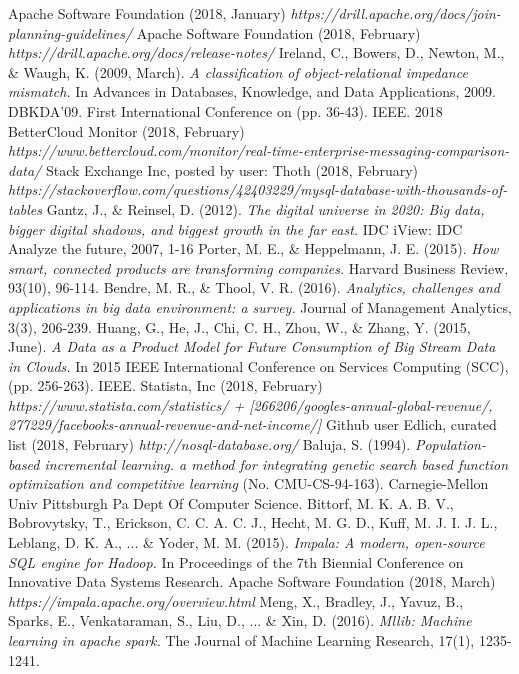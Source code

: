 \documentclass[a4paper,english]{report}
\begin{document}
\begin{thebibliography}{1}
		Apache Software Foundation (2018, January)
		\emph{https://drill.apache.org/docs/join-planning-guidelines/}
		Apache Software Foundation (2018, February) 	\emph{https://drill.apache.org/docs/release-notes/}
		Ireland, C., Bowers, D., Newton, M., \& Waugh, K. (2009, March). \emph{A classification of object-relational impedance mismatch.} In Advances in Databases, Knowledge, and Data Applications, 2009. DBKDA'09. First International Conference on (pp. 36-43). IEEE.
		2018 BetterCloud Monitor (2018, February)
		\emph{https://www.bettercloud.com/monitor/real-time-enterprise-messaging-comparison-data/}
		Stack Exchange Inc, posted by user: Thoth (2018, February) \emph{https://stackoverflow.com/questions/42403229/mysql-database-with-thousands-of-tables}
		Gantz, J., \& Reinsel, D. (2012). \emph{The digital universe in 2020: Big data, bigger digital shadows, and biggest growth in the far east.} IDC iView: IDC Analyze the future, 2007, 1-16
		Porter, M. E., \& Heppelmann, J. E. (2015). \emph{How smart, connected products are transforming companies.} Harvard Business Review, 93(10), 96-114.
		Bendre, M. R., \& Thool, V. R. (2016). \emph{Analytics, challenges and applications in big data environment: a survey.} Journal of Management Analytics, 3(3), 206-239.
		Huang, G., He, J., Chi, C. H., Zhou, W., \& Zhang, Y. (2015, June). \emph{A Data as a Product Model for Future Consumption of Big Stream Data in	Clouds.} In 2015 IEEE International Conference on Services Computing (SCC), (pp. 256-263). IEEE.
		Statista, Inc (2018, February) \emph{https://www.statista.com/statistics/ + [266206/googles-annual-global-revenue/, 277229/facebooks-annual-revenue-and-net-income/]}
		Github user Edlich, curated list (2018, February) \emph{http://nosql-database.org/}
		Baluja, S. (1994). \emph{Population-based incremental learning. a method for integrating genetic search based function optimization and competitive learning} (No. CMU-CS-94-163). Carnegie-Mellon Univ Pittsburgh Pa Dept Of Computer Science.
		Bittorf, M. K. A. B. V., Bobrovytsky, T., Erickson, C. C. A. C. J., Hecht, M. G. D., Kuff, M. J. I. J. L., Leblang, D. K. A., ... \& Yoder, M. M. (2015). \emph{Impala: A modern, open-source SQL engine for Hadoop.} In Proceedings of the 7th Biennial Conference on Innovative Data Systems Research.
		Apache Software Foundation (2018, March) 
		\emph{https://impala.apache.org/overview.html}
		Meng, X., Bradley, J., Yavuz, B., Sparks, E., Venkataraman, S., Liu, D., ... \& Xin, D. (2016). \emph{Mllib: Machine learning in apache spark.} The Journal of Machine Learning Research, 17(1), 1235-1241.
	\end{thebibliography}
\end{document}
